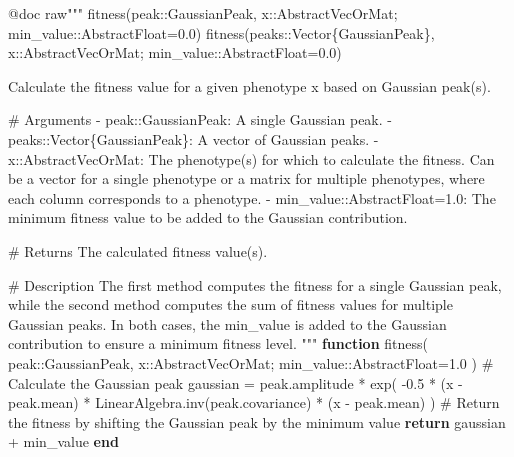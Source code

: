 \documentclass[
]{scrartcl}
\newenvironment{Shaded}{\begin{snugshade}}{\end{snugshade}}
\newcommand{\BuiltInTok}[1]{\textcolor[rgb]{0.00,0.23,0.31}{#1}}
\newcommand{\CharTok}[1]{\textcolor[rgb]{0.13,0.47,0.30}{#1}}
\newcommand{\CommentTok}[1]{\textcolor[rgb]{0.37,0.37,0.37}{#1}}
\newcommand{\ControlFlowTok}[1]{\textcolor[rgb]{0.00,0.23,0.31}{\textbf{#1}}}
\newcommand{\DataTypeTok}[1]{\textcolor[rgb]{0.68,0.00,0.00}{#1}}
\newcommand{\FloatTok}[1]{\textcolor[rgb]{0.68,0.00,0.00}{#1}}
\newcommand{\FunctionTok}[1]{\textcolor[rgb]{0.28,0.35,0.67}{#1}}
\newcommand{\KeywordTok}[1]{\textcolor[rgb]{0.00,0.23,0.31}{\textbf{#1}}}
\newcommand{\NormalTok}[1]{\textcolor[rgb]{0.00,0.23,0.31}{#1}}
\newcommand{\OperatorTok}[1]{\textcolor[rgb]{0.37,0.37,0.37}{#1}}
\newcommand{\PreprocessorTok}[1]{\textcolor[rgb]{0.68,0.00,0.00}{#1}}
\newcommand{\StringTok}[1]{\textcolor[rgb]{0.13,0.47,0.30}{#1}}
\begin{document}
\begin{Shaded}
\begin{Highlighting}[]
\PreprocessorTok{@doc} \StringTok{raw"""}
\StringTok{    fitness(peak::GaussianPeak, x::AbstractVecOrMat; min\_value::AbstractFloat=0.0)}
\StringTok{    fitness(peaks::Vector\{GaussianPeak\}, x::AbstractVecOrMat; min\_value::AbstractFloat=0.0)}

\StringTok{Calculate the fitness value for a given phenotype \textasciigrave{}x\textasciigrave{} based on Gaussian peak(s).}

\StringTok{\# Arguments}
\StringTok{{-} \textasciigrave{}peak::GaussianPeak\textasciigrave{}: A single Gaussian peak.}
\StringTok{{-} \textasciigrave{}peaks::Vector\{GaussianPeak\}\textasciigrave{}: A vector of Gaussian peaks.}
\StringTok{{-} \textasciigrave{}x::AbstractVecOrMat\textasciigrave{}: The phenotype(s) for which to calculate the fitness.}
\StringTok{  Can be a vector for a single phenotype or a matrix for multiple phenotypes,}
\StringTok{  where each column corresponds to a phenotype.}
\StringTok{{-} \textasciigrave{}min\_value::AbstractFloat=1.0\textasciigrave{}: The minimum fitness value to be added to the}
\StringTok{  Gaussian contribution.}

\StringTok{\# Returns}
\StringTok{The calculated fitness value(s).}

\StringTok{\# Description}
\StringTok{The first method computes the fitness for a single Gaussian peak, while the}
\StringTok{second method computes the sum of fitness values for multiple Gaussian peaks. In}
\StringTok{both cases, the \textasciigrave{}min\_value\textasciigrave{} is added to the Gaussian contribution to ensure a}
\StringTok{minimum fitness level.}
\StringTok{"""}
\KeywordTok{function} \FunctionTok{fitness}\NormalTok{(}
\NormalTok{    peak}\OperatorTok{::}\DataTypeTok{GaussianPeak}\NormalTok{, x}\OperatorTok{::}\DataTypeTok{AbstractVecOrMat}\NormalTok{; min\_value}\OperatorTok{::}\DataTypeTok{AbstractFloat}\NormalTok{=}\FloatTok{1.0}
\NormalTok{)}
    \CommentTok{\# Calculate the Gaussian peak}
\NormalTok{    gaussian }\OperatorTok{=}\NormalTok{ peak.amplitude }\OperatorTok{*} \FunctionTok{exp}\NormalTok{(}
        \OperatorTok{{-}}\FloatTok{0.5} \OperatorTok{*}
\NormalTok{        (x }\OperatorTok{{-}}\NormalTok{ peak.mean)}\CharTok{\textquotesingle{} *}
        \BuiltInTok{LinearAlgebra}\NormalTok{.}\FunctionTok{inv}\NormalTok{(peak.covariance) }\OperatorTok{*}
\NormalTok{        (x }\OperatorTok{{-}}\NormalTok{ peak.mean)}
\NormalTok{    )}
    \CommentTok{\# Return the fitness by shifting the Gaussian peak by the minimum value}
    \ControlFlowTok{return}\NormalTok{ gaussian }\OperatorTok{+}\NormalTok{ min\_value}
\KeywordTok{end}


\end{Highlighting}
\end{Shaded}
\end{document}
